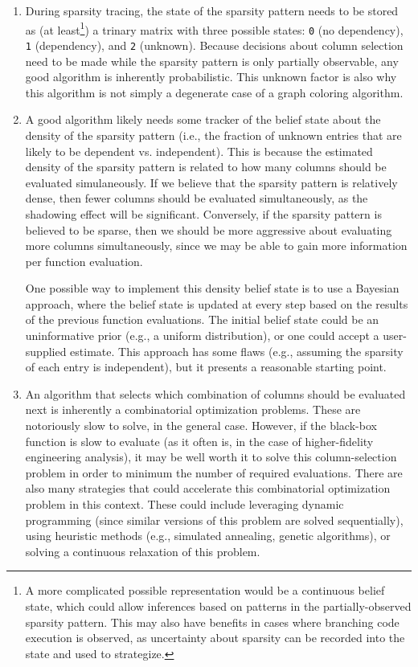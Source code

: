 \begin{enumerate}
    \item During sparsity tracing, the state of the sparsity pattern needs to be stored as (at least\footnote{A more complicated possible representation would be a continuous belief state, which could allow inferences based on patterns in the partially-observed sparsity pattern. This may also have benefits in cases where branching code execution is observed, as uncertainty about sparsity can be recorded into the state and used to strategize.}) a trinary matrix with three possible states: \texttt{0} (no dependency), \texttt{1} (dependency), and \texttt{2} (unknown). Because decisions about column selection need to be made while the sparsity pattern is only partially observable, any good algorithm is inherently probabilistic. This unknown factor is also why this algorithm is not simply a degenerate case of a graph coloring algorithm.
    \item A good algorithm likely needs some tracker of the belief state about the density of the sparsity pattern (i.e., the fraction of unknown entries that are likely to be dependent vs. independent). This is because the estimated density of the sparsity pattern is related to how many columns should be evaluated simulaneously. If we believe that the sparsity pattern is relatively dense, then fewer columns should be evaluated simultaneously, as the shadowing effect will be significant. Conversely, if the sparsity pattern is believed to be sparse, then we should be more aggressive about evaluating more columns simultaneously, since we may be able to gain more information per function evaluation.

    One possible way to implement this density belief state is to use a Bayesian approach, where the belief state is updated at every step based on the results of the previous function evaluations. The initial belief state could be an uninformative prior (e.g., a uniform distribution), or one could accept a user-supplied estimate. This approach has some flaws (e.g., assuming the sparsity of each entry is independent), but it presents a reasonable starting point.

    \item An algorithm that selects which combination of columns should be evaluated next is inherently a combinatorial optimization problems. These are notoriously slow to solve, in the general case. However, if the black-box function is slow to evaluate (as it often is, in the case of higher-fidelity engineering analysis), it may be well worth it to solve this column-selection problem in order to minimum the number of required evaluations. There are also many strategies that could accelerate this combinatorial optimization problem in this context. These could include leveraging dynamic programming (since similar versions of this problem are solved sequentially), using heuristic methods (e.g., simulated annealing, genetic algorithms), or solving a continuous relaxation of this problem.


\end{enumerate}
